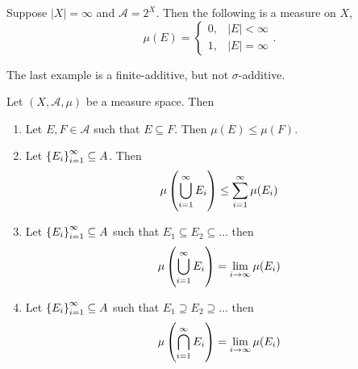\documentclass[11pt,a4paper]{article}
\newcommand{\A}{\mathcal A}
\begin{document}
\begin{example}
  Suppose $|X| = \infty$ and $\A = 2^X$.
  Then the following is a measure on $X$,
  \[
    \mu(E) =
    \begin{cases}
      0, &|E| < \infty \\
      1, &|E| = \infty
    \end{cases}.
  \]
\end{example}
\begin{remark}
  The last example is a finite-additive, but not $\sigma$-additive.
\end{remark}

\begin{proposition}
  Let $(X, \A, \mu)$ be a measure space.
  Then
  \begin{enumerate}
    \item[(1)] Let $E,F \in \A$ such that $E \subseteq F$.
      Then $\mu(E) \le \mu(F)$.
    \item[(2)] Let $\left\{E_i\right\}_{i=1}^{\infty} \subseteq A$.
      Then
      \[
        \mu\del{\bigcup_{i=1}^{\infty} E_i} \le \sum_{i=1}^{\infty} \mu(E_i)
      \]
    \item[(3)] Let $\left\{E_i\right\}_{i=1}^{\infty} \subseteq A$ such that
      $E_1 \subseteq E_2 \subseteq \dots$ then
      \[
        \mu\del{\bigcup_{i=1}^{\infty} E_i} =
        \lim_{i \to \infty} \mu(E_i)
      \]
    \item[(4)] Let $\left\{E_i\right\}_{i=1}^{\infty} \subseteq A$ such that
      $E_1 \supseteq E_2 \supseteq \dots$ then
      \[
        \mu\del{\bigcap_{i=1}^{\infty} E_i} =
        \lim_{i \to \infty} \mu(E_i)
      \]
  \end{enumerate}
\end{proposition}
\end{document}
